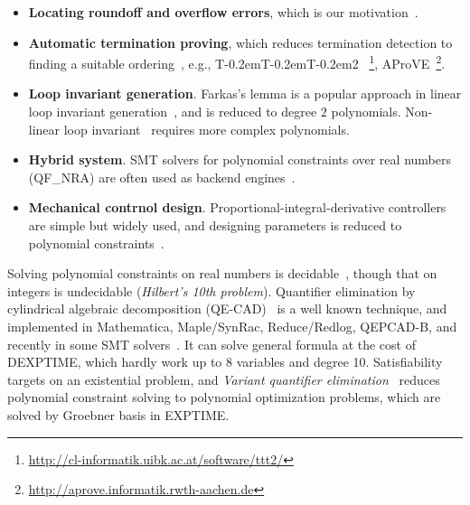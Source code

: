 \documentclass[runningheads,a4paper,oribibl]{llncs}
\newcommand\TTTT{%
 \textsf{T\kern-0.2em\raisebox{-0.3em}T\kern-0.2emT\kern-0.2em\raisebox{-0.3em}2}%
}
\begin{document}
\begin{itemize}
\item {\bf Locating roundoff and overflow errors}, 
which is our motivation~\cite{Ngoc:2009:ORE:1685167.1685421,Ngoc:2010:CRE:1858996.1859056}. 

\item {\bf Automatic termination proving}, 
which reduces termination detection to finding a suitable ordering~\cite{Lucas:2008:CCS:1361735.1361760}, 
e.g., \TTTT~\footnote{\url{http://cl-informatik.uibk.ac.at/software/ttt2/}}, 
AProVE~\footnote{\url{http://aprove.informatik.rwth-aachen.de}}. 

\item {\bf Loop invariant generation}. 
Farkas's lemma is a popular approach in linear loop invariant generation~\cite{Colon}, 
and is reduced to degree $2$ polynomials. 
Non-linear loop invariant~\cite{Sankaranarayanan:2004:NLI:982962.964028} requires more complex polynomials.

\item {\bf Hybrid system}. SMT solvers for polynomial constraints over real numbers (QF\_NRA) are often used as backend engines~\cite{Sankaranarayanan04constructinginvariants}. 

\item {\bf Mechanical contrnol design}. 
Proportional-integral-derivative controllers are simple but widely used, and designing parameters is 
reduced to polynomial constraints~\cite{control}. 
\end{itemize}	

Solving polynomial constraints on real numbers is decidable~\cite{tarski}, 
though that on integers is undecidable ({\em Hilbert's 10th problem}). 
Quantifier elimination by cylindrical algebraic decomposition (QE-CAD)~\cite{qecad} 
is a well known technique, and 
implemented in Mathematica, Maple/SynRac, Reduce/Redlog, QEPCAD-B, and recently 
in some SMT solvers~\cite{Jovanovic13}. 
It can solve general formula at the cost of DEXPTIME, which hardly work up to 8 variables and degree 10.
Satisfiability targets on an existential problem, and 
{\em Variant quantifier elimination}~\cite{Hong2012883} reduces polynomial constraint solving to 
polynomial optimization problems, which are solved by Groebner basis in EXPTIME. 
\end{document}

